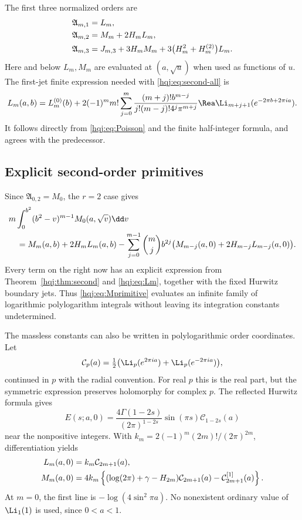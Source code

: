 The first three normalized orders are
\begin{align}
\mathfrak A_{m,1}&=L_m,\notag\\
\mathfrak A_{m,2}&=M_m+2H_mL_m,\label{hqj:eq:normalized-low}\\
\mathfrak A_{m,3}&=J_{m,3}+3H_mM_m
+3\bigl(H_m^2+H_m^{(2)}\bigr)L_m.\notag
\end{align}
Here and below $L_m,M_m$ are evaluated at $(a,\sqrt u)$ when used as
functions of $u$. The first-jet finite expression needed with
\eqref{hqj:eq:second-all} is
\begin{equation}\label{hqj:eq:Lm}
L_m(a,b)=L_m^{(0)}(b)+2(-1)^m m!
\sum_{j=0}^m\frac{(m+j)!b^{m-j}}{j!(m-j)!4^j\pi^{m+j}}
\Rea\Li_{m+j+1}(e^{-2\pi b+2\pi ia}).
\end{equation}
It follows directly from \eqref{hqj:eq:Poisson} and the finite
half-integer formula, and agrees with the predecessor.

\subsection{Explicit second-order primitives}
Since $\mathfrak A_{0,2}=M_0$, the $r=2$ case gives
\begin{align}
&m\int_0^{b^2}(b^2-v)^{m-1}M_0(a,\sqrt v)\dd v\notag\\
&\quad=M_m(a,b)+2H_mL_m(a,b)
-\sum_{j=0}^{m-1}\binom mj b^{2j}
\bigl(M_{m-j}(a,0)+2H_{m-j}L_{m-j}(a,0)\bigr).
\label{hqj:eq:Mprimitive}
\end{align}
Every term on the right now has an explicit expression from
Theorem~\ref{hqj:thm:second} and \eqref{hqj:eq:Lm}, together with the
fixed Hurwitz boundary jets. Thus \eqref{hqj:eq:Mprimitive} evaluates
an infinite family of logarithmic polylogarithm integrals without
leaving its integration constants undetermined.

The massless constants can also be written in polylogarithmic order
coordinates. Let
\[
\mathcal C_p(a)=\tfrac12\bigl(\Li_p(e^{2\pi ia})+
\Li_p(e^{-2\pi ia})\bigr),
\]
continued in $p$ with the radial convention. For real $p$ this is the
real part, but the symmetric expression preserves holomorphy for
complex $p$. The reflected Hurwitz formula \cite{hurwitz} gives
\begin{equation}\label{hqj:eq:massless-functional}
E(s;a,0)=\frac{4\Gamma(1-2s)}{(2\pi)^{1-2s}}
\sin(\pi s)\mathcal C_{1-2s}(a)
\end{equation}
near the nonpositive integers. With
$k_m=2(-1)^m(2m)!/(2\pi)^{2m}$, differentiation yields
\begin{align}
L_m(a,0)&=k_m\mathcal C_{2m+1}(a),\notag\\
M_m(a,0)&=4k_m\left\{
(\log(2\pi)+\gamma-H_{2m})\mathcal C_{2m+1}(a)
-\mathcal C_{2m+1}^{[1]}(a)\right\}.
\label{hqj:eq:massless-second}
\end{align}
At $m=0$, the first line is $-\log(4\sin^2\pi a)$.
No nonexistent ordinary value of $\Li_1(1)$ is used, since $0<a<1$.
